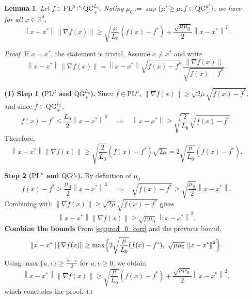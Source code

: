 \documentclass{article}
\def\R{{\mathbb{R}}}
\def\pl{{\text{PL}^\mu}}
\newcommand{\bpar}[1]{\left(#1\right)}
\newcommand{\norm}[1]{\left\lVert#1\right\rVert}
\newcommand{\qg}{\text{QG}_{+}^{L_0}}
\newcommand{\qginff}[1]{\text{QG}_{-}^{#1}}
\theoremstyle{plain}
\newtheorem{lemma}[theorem]{Lemma}
\theoremstyle{definition}
\theoremstyle{remark}
\begin{document}
\begin{lemma}\label{lem:prod}
Let $f \in \pl \cap \qg$. Noting $
\mu_0 := \sup \{\mu'\ge \mu: f \in  \qginff{\mu'} \}$, 
we have for all $x\in\R^d$,
\[
\norm{x-x^\ast}\norm{\nabla f(x)}
\ge \sqrt{\frac{\mu}{L_0}}(f(x)-f^\ast) + \frac{\sqrt{\mu \mu_0}}{2}\norm{x-x^\ast}^2.
\]
\end{lemma}

\begin{proof}
If $x = x^\ast$, the statement is trivial. Assume $x \ne x^\ast$ and write
\[
\norm{x-x^\ast}\norm{\nabla f(x)}
= \norm{x-x^\ast}\sqrt{f(x)-f^\ast}\,\frac{\norm{\nabla f(x)}}{\sqrt{f(x)-f^\ast}}.
\]

\medskip
\noindent\textbf{(1) Step 1 ($\pl$ and $\qg$).}
Since $f\in\pl$, $\norm{\nabla f(x)}\ge \sqrt{2\mu}\sqrt{f(x)-f^\ast}$, and since $f\in\qg$,
\[
f(x)-f^\ast \le \frac{L_0}{2}\norm{x-x^\ast}^2
\quad\Rightarrow\quad
\norm{x-x^\ast}\ge \sqrt{\frac{2}{L_0}}\sqrt{f(x)-f^\ast}.
\]
Therefore,
\begin{equation}\label{eq:prod_0_corr}
\norm{x-x^\ast}\norm{\nabla f(x)}
\ge \sqrt{\frac{2}{L_0}}(f(x)-f^\ast)\sqrt{2\mu}
= 2\sqrt{\frac{\mu}{L_0}}(f(x)-f^\ast).
\end{equation}

\medskip
\noindent\textbf{Step 2 ($\pl$ and $\qginff{\mu_0}$).}
By definition of $\mu_0$
\[
f(x)-f^\ast \ge \frac{\mu_0}{2}\norm{x-x^\ast}^2
\quad\Rightarrow\quad
\sqrt{f(x)-f^\ast}\ge \sqrt{\frac{\mu_0}{2}}\norm{x-x^\ast}.
\]
Combining with $\norm{\nabla f(x)}\ge \sqrt{2\mu}\sqrt{f(x)-f^\ast}$ gives
\begin{equation}\label{eq:prod_1_corr}
\norm{x-x^\ast}\norm{\nabla f(x)}
\ge \sqrt{\mu\mu_0}\,\norm{x-x^\ast}^2.
\end{equation}
\medskip
\noindent\textbf{Combine
 the bounds}
From \eqref{eq:prod_0_corr} and the previous bound,
\[
\norm{x-x^\ast}\norm{\nabla f(x)}
\ge \max\Bigl\{2\sqrt{\frac{\mu}{L_0}}(f(x)-f^\ast),\ \sqrt{\mu\mu_0}\,\norm{x-x^\ast}^2\Bigr\}.
\]
Using $\max\{u,v\}\ge \frac{u+v}{2}$ for $u,v\ge 0$, we obtain
\[
\norm{x-x^\ast}\norm{\nabla f(x)}
\ge \sqrt{\frac{\mu}{L_0}}(f(x)-f^\ast) + \frac{\sqrt{\mu\mu_0}}{2}\norm{x-x^\ast}^2,
\]
which concludes the proof.
\end{proof}







    
\end{document}
